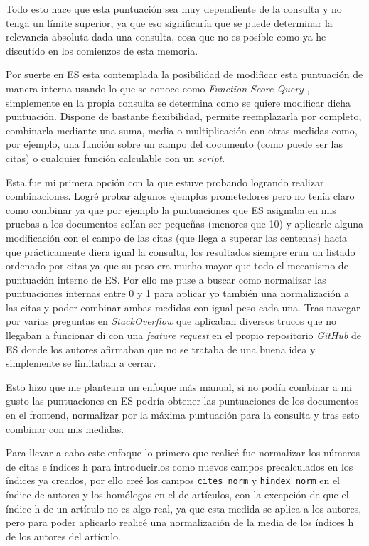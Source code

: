 Todo esto hace que esta puntuación sea muy dependiente de la consulta y no tenga un límite superior, ya que eso significaría que se puede determinar la relevancia absoluta dada una consulta, cosa que no es posible como ya he discutido en los comienzos de esta memoria. 

Por suerte en \acrshort{ES} esta contemplada la posibilidad de modificar esta puntuación de manera interna usando lo que se conoce como \textit{Function Score Query} \cite{ES_func_score}, simplemente en la propia consulta se determina como se quiere modificar dicha puntuación. Dispone de bastante flexibilidad, permite reemplazarla por completo, combinarla mediante una suma, media o multiplicación con otras medidas como, por ejemplo, una función sobre un campo del documento (como puede ser las citas) o cualquier función calculable con un \textit{script}. 

Esta fue mi primera opción con la que estuve probando logrando realizar combinaciones. Logré probar algunos ejemplos prometedores pero no tenía claro como combinar ya que por ejemplo la puntuaciones que \acrshort{ES} asignaba en mis pruebas a los documentos solían ser pequeñas (menores que 10) y aplicarle alguna modificación con el campo de las citas (que llega a superar las centenas) hacía que prácticamente diera igual la consulta, los resultados siempre eran un listado ordenado por citas ya que su peso era mucho mayor que todo el mecanismo de puntuación interno de \acrshort{ES}. Por ello me puse a buscar como normalizar las puntuaciones internas entre 0 y 1 para aplicar yo también una normalización a las citas y poder combinar ambas medidas con igual peso cada una. Tras navegar por varias preguntas en \textit{StackOverflow} que aplicaban diversos trucos que no llegaban a funcionar di con una \textit{feature request} en el propio repositorio \textit{GitHub} de \acrshort{ES} \cite{ES_normalize_score} donde los autores afirmaban que no se trataba de una buena idea y simplemente se limitaban a cerrar.

Esto hizo que me planteara un enfoque más manual, si no podía combinar a mi gusto las puntuaciones en \acrshort{ES} podría obtener las puntuaciones de los documentos en el \gls{frontend}, normalizar por la máxima puntuación para la consulta y tras esto combinar con mis medidas. 

Para llevar a cabo este enfoque lo primero que realicé fue normalizar los números de citas e índices h para introducirlos como nuevos campos precalculados en los índices ya creados, por ello creé los campos \texttt{cites\_norm} y \texttt{hindex\_norm} en el índice de autores y los homólogos en el de artículos, con la excepción de que el índice h de un artículo no es algo real, ya que esta medida se aplica a los autores, pero para poder aplicarlo realicé una normalización de la media de los índices h de los autores del artículo.

